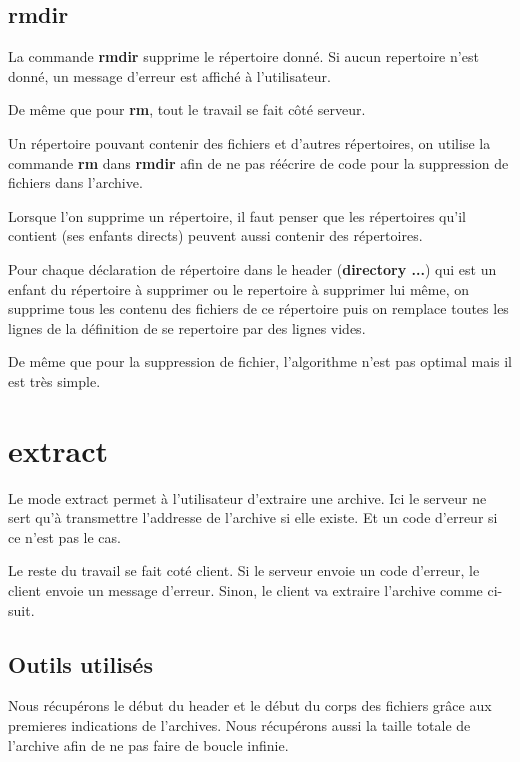 \documentclass[titlepage]{article}
\begin{document}
	\subsection{rmdir}

	La commande \textbf{rmdir} supprime le répertoire donné. Si aucun repertoire n'est donné, un message d'erreur est affiché à l'utilisateur.

	De même que pour \textbf{rm}, tout le travail se fait côté serveur.

	Un répertoire pouvant contenir des fichiers et d'autres répertoires, on utilise la commande \textbf{rm} dans \textbf{rmdir} afin de ne pas réécrire de code pour la suppression de fichiers dans l'archive.

	Lorsque l'on supprime un répertoire, il faut penser que les répertoires qu'il contient (ses enfants directs) peuvent aussi contenir des répertoires. 

	Pour chaque déclaration de répertoire dans le header (\textbf{directory ...}) qui est un enfant du répertoire à supprimer ou le repertoire à supprimer lui même, on supprime tous les contenu des fichiers de ce répertoire puis on remplace toutes les lignes de la définition de se repertoire par des lignes vides.

	De même que pour la suppression de fichier, l'algorithme n'est pas optimal mais il est très simple.  

	\section{extract}

	Le mode extract permet à l’utilisateur d’extraire une archive. Ici le serveur ne sert qu’à transmettre l’addresse de l’archive si elle existe. Et un code d’erreur si ce n’est pas le cas. 

	Le reste du travail se fait coté client. Si le serveur envoie un code d’erreur, le client envoie un message d’erreur. Sinon, le client va extraire l’archive comme ci-suit.

	\subsection{Outils utilisés}

	Nous récupérons le début du header et le début du corps des fichiers grâce aux premieres indications de l’archives. Nous récupérons aussi la taille totale de l’archive afin de ne pas faire de boucle infinie.
\end{document}

